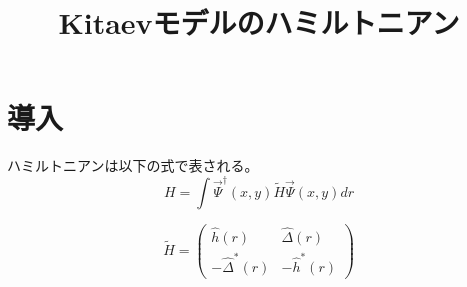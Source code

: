 \documentclass{jarticle}
\begin{document}
\title{Kitaevモデルのハミルトニアン}
\maketitle

\tableofcontents
\section{導入}

ハミルトニアンは以下の式で表される。
\begin{equation}
  H=\int\vec{\Psi}^\dagger(x,y)\tilde{H}\vec{\Psi}(x,y)dr
\end{equation}

\begin{equation}
\tilde{H}=
\begin{pmatrix}
	\hat{h}(r) & \hat{\Delta}(r) \\ 
	-\hat{\Delta}^{*}(r) & -\hat{h}^{*}(r)
\end{pmatrix} 
\end{equation}
\end{document}
